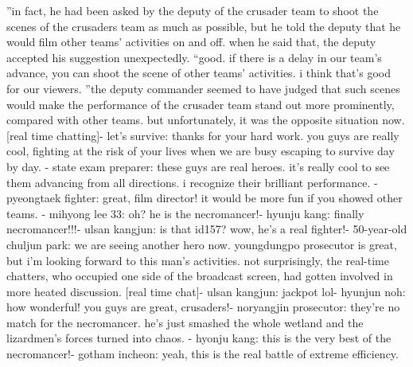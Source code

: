 ”in fact, he had been asked by the deputy of the crusader team to shoot the scenes of the crusaders team as much as possible, but he told the deputy that he would film other teams’ activities on and off.
 when he said that, the deputy accepted his suggestion unexpectedly.
“good.
 if there is a delay in our team’s advance, you can shoot the scene of other teams’ activities.
 i think that’s good for our viewers.
”the deputy commander seemed to have judged that such scenes would make the performance of the crusader team stand out more prominently, compared with other teams.
but unfortunately, it was the opposite situation now.
[real time chatting]- let’s survive: thanks for your hard work.
 you guys are really cool, fighting at the risk of your lives when we are busy escaping to survive day by day.
- state exam preparer: these guys are real heroes.
 it’s really cool to see them advancing from all directions.
 i recognize their brilliant performance.
- pyeongtaek fighter: great, film director! it would be more fun if you showed other teams.
- mihyong lee 33: oh? he is the necromancer!- hyunju kang: finally necromancer!!!- ulsan kangjun: is that id157? wow, he’s a real fighter!- 50-year-old chuljun park: we are seeing another hero now.
 youngdungpo prosecutor is great, but i’m looking forward to this man’s activities.
not surprisingly, the real-time chatters, who occupied one side of the broadcast screen, had gotten involved in more heated discussion.
[real time chat]- ulsan kangjun: jackpot lol- hyunjun noh: how wonderful! you guys are great, crusaders!- noryangjin prosecutor: they’re no match for the necromancer.
 he’s just smashed the whole wetland and the lizardmen’s forces turned into chaos.
- hyonju kang: this is the very best of the necromancer!- gotham incheon: yeah, this is the real battle of extreme efficiency.

